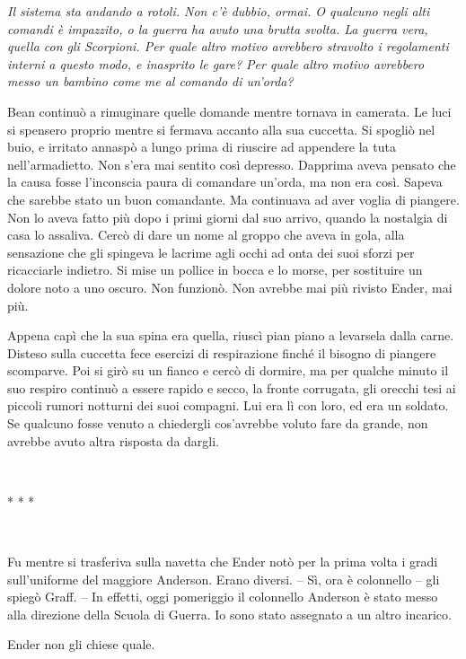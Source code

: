 \emph{{Il sistema sta andando a rotoli. Non c'è dubbio, ormai. O
		qualcuno negli alti comandi è impazzito, o la guerra ha avuto una brutta
		svolta. La guerra vera, quella con gli Scorpioni. Per quale altro motivo
		avrebbero stravolto i regolamenti interni a questo modo, e inasprito le
		gare? Per quale altro motivo avrebbero messo un bambino come me al
		comando di un'orda?}}

{Bean continuò a rimuginare quelle domande mentre tornava in camerata.
	Le luci si spensero proprio mentre si fermava accanto alla sua cuccetta.
	Si spogliò nel buio, e irritato annaspò a lungo prima di riuscire ad
	appendere la tuta nell'armadietto. Non s'era mai sentito così depresso.
	Dapprima aveva pensato che la causa fosse l'inconscia paura di comandare
	un'orda, ma non era così. Sapeva che sarebbe stato un buon comandante.
	Ma continuava ad aver voglia di piangere. Non lo aveva fatto più dopo i
	primi giorni dal suo arrivo, quando la nostalgia di casa lo assaliva.
	Cercò di dare un nome al groppo che aveva in gola, alla sensazione che
	gli spingeva le lacrime agli occhi ad onta dei suoi sforzi per
	ricacciarle indietro. Si mise un pollice in bocca e lo morse, per
	sostituire un dolore noto a uno oscuro. Non funzionò. Non avrebbe mai
	più rivisto Ender, mai più.}

{Appena capì che la sua spina era quella, riuscì pian piano a levarsela
	dalla carne. Disteso sulla cuccetta fece esercizi di respirazione finché
	il bisogno di piangere scomparve. Poi si girò su un fianco e cercò di
	dormire, ma per qualche minuto il suo respiro continuò a essere rapido e
	secco, la fronte corrugata, gli orecchi tesi ai piccoli rumori notturni
	dei suoi compagni. Lui era lì con loro, ed era un soldato. Se qualcuno
	fosse venuto a chiedergli cos'avrebbe voluto fare da grande, non avrebbe
	avuto altra risposta da dargli.}

{~}

\begin{center}
	{* * *}
\end{center}

{~}

{Fu mentre si trasferiva sulla navetta che Ender notò per la prima volta
	i gradi sull'uniforme del maggiore Anderson. Erano diversi. -- Sì, ora è
	colonnello -- gli spiegò Graff. -- In effetti, oggi pomeriggio il
	colonnello Anderson è stato messo alla direzione della Scuola di Guerra.
	Io sono stato assegnato a un altro incarico.}

{Ender non gli chiese quale.}

